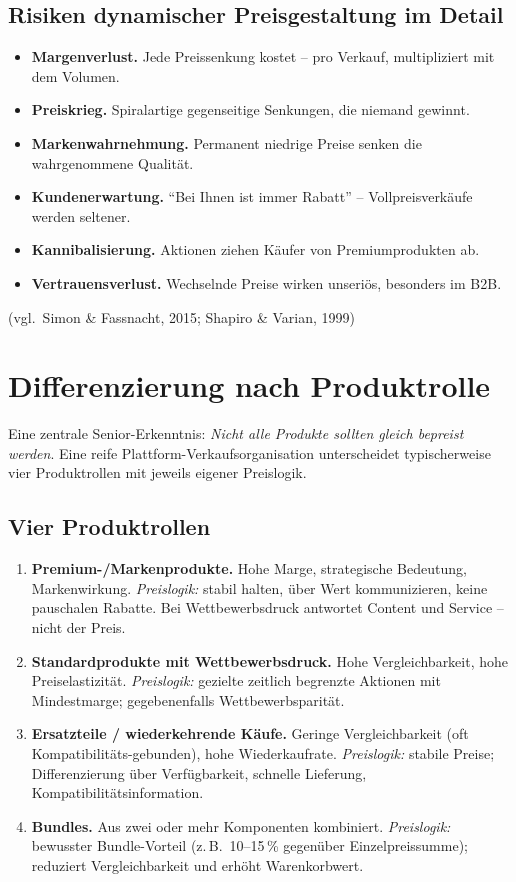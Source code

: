 \documentclass[11pt,a4paper,oneside]{article}
\newcommand{\fachbegriff}[1]{\textbf{#1}}
\newcommand{\quelle}[1]{{\footnotesize\color{lpGray}(#1)}}
\begin{document}
\subsection{Risiken dynamischer Preisgestaltung im Detail}

\begin{itemize}
  \item \textbf{Margenverlust.} Jede Preissenkung kostet -- pro Verkauf, multipliziert mit dem Volumen.
  \item \textbf{Preiskrieg.} Spiralartige gegenseitige Senkungen, die niemand gewinnt.
  \item \textbf{Markenwahrnehmung.} Permanent niedrige Preise senken die wahrgenommene Qualität.
  \item \textbf{Kundenerwartung.} ``Bei Ihnen ist immer Rabatt'' -- Vollpreisverkäufe werden seltener.
  \item \textbf{Kannibalisierung.} Aktionen ziehen Käufer von Premiumprodukten ab.
  \item \textbf{Vertrauensverlust.} Wechselnde Preise wirken unseriös, besonders im B2B.
\end{itemize}

\quelle{vgl.\ Simon \& Fassnacht, 2015; Shapiro \& Varian, 1999}

\section{Differenzierung nach Produktrolle}

Eine zentrale Senior-Erkenntnis: \emph{Nicht alle Produkte sollten gleich bepreist werden}. Eine reife Plattform-Verkaufsorganisation unterscheidet typischerweise vier Produktrollen mit jeweils eigener Preislogik.

\subsection{Vier Produktrollen}

\begin{enumerate}
  \item \fachbegriff{Premium-/Markenprodukte.} Hohe Marge, strategische Bedeutung, Markenwirkung. \emph{Preislogik:} stabil halten, über Wert kommunizieren, keine pauschalen Rabatte. Bei Wettbewerbsdruck antwortet Content und Service -- nicht der Preis.
  \item \fachbegriff{Standardprodukte mit Wettbewerbsdruck.} Hohe Vergleichbarkeit, hohe Preiselastizität. \emph{Preislogik:} gezielte zeitlich begrenzte Aktionen mit Mindestmarge; gegebenenfalls Wettbewerbsparität.
  \item \fachbegriff{Ersatzteile / wiederkehrende Käufe.} Geringe Vergleichbarkeit (oft Kompatibilitäts-gebunden), hohe Wiederkaufrate. \emph{Preislogik:} stabile Preise; Differenzierung über Verfügbarkeit, schnelle Lieferung, Kompatibilitätsinformation.
  \item \fachbegriff{Bundles.} Aus zwei oder mehr Komponenten kombiniert. \emph{Preislogik:} bewusster Bundle-Vorteil (z.\,B.\ 10--15\,\% gegenüber Einzelpreissumme); reduziert Vergleichbarkeit und erhöht Warenkorbwert.
\end{enumerate}
\end{document}
